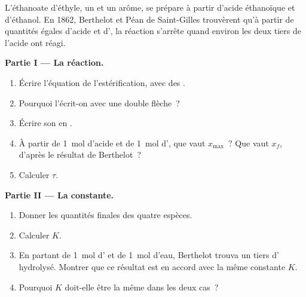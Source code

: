 \begin{problem}
\label{pb:g12:equilibrium:1}
L'éthanoate d'éthyle, un  et un arôme, se prépare à partir
d'acide éthanoïque et d'éthanol. En 1862, Berthelot et Péan de
Saint-Gilles trouvèrent qu'à partir de quantités égales d'acide et
d', la réaction s'arrête quand environ les deux tiers de l'acide
ont réagi.

\medskip
\noindent\textbf{Partie I --- La réaction.}
\begin{enumerate}
  \item Écrire l'équation de l'estérification, avec des .
  \item Pourquoi l'écrit-on avec une double flèche~?
  \item Écrire son  en .
  \item À partir de \qty{1}{mol} d'acide et de \qty{1}{mol} d',
        que vaut $x_{\max}$~? Que vaut $x_f$, d'après le résultat de
        Berthelot~?
  \item Calculer $\tau$.
\end{enumerate}

\medskip
\noindent\textbf{Partie II --- La constante.}
\begin{enumerate}[resume]
  \item Donner les quantités finales des quatre espèces.
  \item Calculer $K$.
  \item En partant de \qty{1}{mol} d' et de \qty{1}{mol} d'eau,
        Berthelot trouva un tiers d' hydrolysé. Montrer que ce
        résultat est en accord avec la même constante $K$.
  \item Pourquoi $K$ doit-elle être la même dans les deux cas~?
\end{enumerate}


\end{problem}
